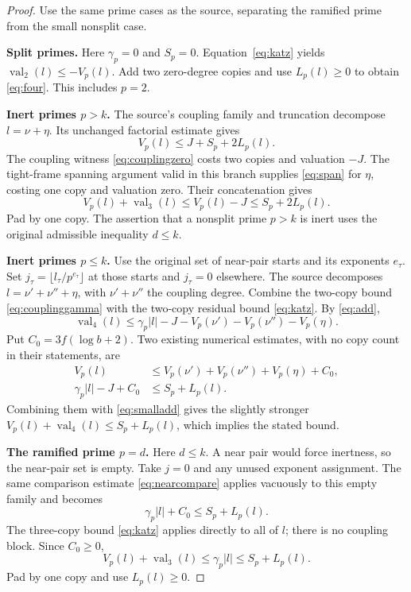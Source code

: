 \documentclass[11pt,letterpaper]{article}
\theoremstyle{remark}\newtheorem{remark}[theorem]{Remark}
\newcommand{\val}{\operatorname{val}}
\begin{document}
\begin{proof}
Use the same prime cases as the source, separating the ramified prime from
the small nonsplit case.

\textbf{Split primes.}
Here $\gamma_p=0$ and $S_p=0$.
Equation~\eqref{eq:katz} yields $\val_2(l)\leq-V_p(l)$.
Add two zero-degree copies and use $L_p(l)\geq0$ to obtain
\eqref{eq:four}. This includes $p=2$.

\textbf{Inert primes $p>k$.}
The source's coupling family and truncation decompose $l=\nu+\eta$.
Its unchanged factorial estimate gives
\[
 V_p(l)\leq J+S_p+2L_p(l).
\]
The coupling witness \eqref{eq:couplingzero} costs two copies and
valuation $-J$. The tight-frame spanning argument valid in this branch
supplies \eqref{eq:span} for $\eta$, costing one copy and valuation zero.
Their concatenation gives
\[
 V_p(l)+\val_3(l)\leq V_p(l)-J\leq S_p+2L_p(l).
\]
Pad by one copy. The assertion that a nonsplit prime $p>k$ is inert
uses the original admissible inequality $d\leq k$.

\textbf{Inert primes $p\leq k$.}
Use the original set of near-pair starts and its exponents $e_\tau$.
Set $j_\tau=\lfloor l_\tau/p^{e_\tau}\rfloor$ at those starts and
$j_\tau=0$ elsewhere.
The source decomposes
$l=\nu'+\nu''+\eta$, with $\nu'+\nu''$ the coupling degree.
Combine the two-copy bound \eqref{eq:couplinggamma} with the
two-copy residual bound \eqref{eq:katz}. By \eqref{eq:add},
\begin{equation}
 \val_4(l)\leq\gamma_p|l|-J
                     -V_p(\nu')-V_p(\nu'')-V_p(\eta).
 \label{eq:smalladd}
\end{equation}
Put $C_0=3f(\log b+2)$.
Two existing numerical estimates, with no copy count in their statements,
are
\begin{align}
 V_p(l)&\leq V_p(\nu')+V_p(\nu'')+V_p(\eta)+C_0,
 \label{eq:factorialloss}\\
 \gamma_p|l|-J+C_0&\leq S_p+L_p(l).
 \label{eq:nearcompare}
\end{align}
Combining them with \eqref{eq:smalladd} gives the slightly stronger
$V_p(l)+\val_4(l)\leq S_p+L_p(l)$, which implies the stated bound.

\textbf{The ramified prime $p=d$.}
Here $d\leq k$. A near pair would force inertness, so the near-pair
set is empty. Take $j=0$ and any unused exponent assignment. The same
comparison estimate \eqref{eq:nearcompare} applies vacuously to this
empty family and becomes
\[
 \gamma_p|l|+C_0\leq S_p+L_p(l).
\]
The three-copy bound \eqref{eq:katz} applies directly to all of $l$;
there is no coupling block. Since $C_0\geq0$,
\[
 V_p(l)+\val_3(l)\leq\gamma_p|l|\leq S_p+L_p(l).
\]
Pad by one copy and use $L_p(l)\geq0$.
\end{proof}
\end{document}
